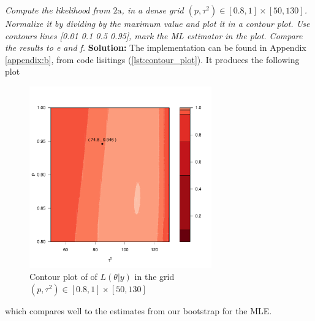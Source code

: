 \emph{Compute the likelihood from $2 \mathrm{a}$, in a dense grid $\left(p, \tau^2\right) \in[0.8,1] \times[50,130]$. Normalize it by dividing by the maximum value and plot it in a contour plot. Use contours lines [0.01 0.1 0.5 0.95], mark the ML estimator in the plot. Compare the results to e and f.} \spaze
\textbf{Solution:} \spaze
The implementation can be found in Appendix \ref{appendix:b}, from code lisitings (\ref{lst:contour_plot}). It produces the following plot
\begin{figure}[H]
  \centering
  \includegraphics[width=0.7\textwidth]{Images/Figures_Exercise_2/contour_plot.pdf}
  \caption{Contour plot of of $L(\theta|y)$ in the grid $\left(p, \tau^2\right) \in[0.8,1] \times[50,130]$}
  \label{fig:contour_plot}
\end{figure}
which compares well to the estimates from our bootstrap for the MLE. 